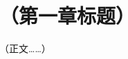 \documentclass{book-zh}
\begin{document}


\frontmatter
\tableofcontents
\mainmatter

\chapter{（第一章标题）}

（正文……）
\end{document}
